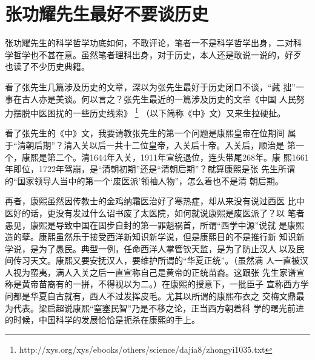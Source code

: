 \chapter{张功耀先生最好不要谈历史}

张功耀先生的科学哲学功底如何，不敢评论，笔者一不是科学哲学出身，二对科
学哲学也不甚在意。虽然笔者理科出身，对于历史，本人还是敢说一说的，好歹
也读了不少历史典籍。

看了张先生几篇涉及历史的文章，深以为张先生最好于历史闭口不谈，“藏
拙”一事在古人亦是美谈。何以言之？张先生最近的一篇涉及历史的文章《中国
人民努力摆脱中医困扰的一些历史线索》
\footnote{http://xys.org/xys/ebooks/others/science/dajia8/zhongyi1035.txt}
（以下简称《中》文）又来生拉硬扯。

看了张先生的《中》文，我要请教张先生的第一个问题是康熙皇帝在位期间
属于“清朝后期”？清入关以后一共十二位皇帝，入关后十帝。入关后，顺治是
第一个，康熙是第二个。清1644年入关，1911年宣统退位，连头带尾268年。康
熙1661年即位，1722年驾崩，是“清朝初期”还是“清朝后期”？就算康熙是张
先生所谓的“国家领导人当中的第一个‘废医派’领袖人物”，怎么着也不是清
朝后期。

再者，康熙虽然因传教士的金鸡纳霜医治好了寒热症，却从来没有说过西医
比中医好的话，更没有发过什么诏书废了太医院，如何就说康熙是废医派了？以
笔者愚见，康熙是导致中国在固步自封的第一罪魁祸首，所谓“西学中源”说就
是康熙造的孽。康熙虽然乐于接受西洋新知识新学说，但是康熙目的不是推行新
知识新学说，是为了愚民。典型一例，任命西洋人掌管钦天监，是为了防止汉人
以及民间传习天文。康熙又要安抚汉人，要维护所谓的“华夏正统”。（虽然满
人一直被汉人视为蛮夷，满人入关之后一直宣称自己是黄帝的正统苗裔。这跟张
先生家谱宣称是黄帝苗裔有的一拼，不得视以为二。）在康熙的授意下，一批臣子
宣称西方学问都是华夏自古就有，西人不过发挥皮毛。尤其以所谓的康熙布衣之
交梅文鼎最为代表。梁启超说康熙“窒塞民智”乃是不移之论，正当西方朝着科
学的曙光前进的时候，中国科学的发展恰恰是扼杀在康熙的手上。
